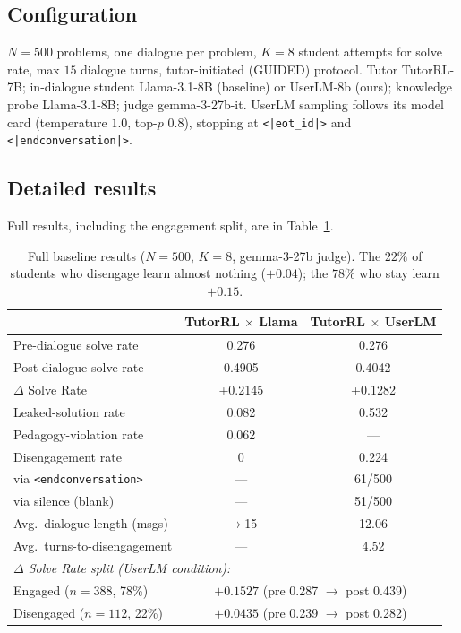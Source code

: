 \documentclass[11pt]{article}
\begin{document}
\subsection{Configuration}
$N{=}500$ problems, one dialogue per problem, $K{=}8$ student attempts for solve
rate, max $15$ dialogue turns, tutor-initiated (GUIDED) protocol. Tutor
TutorRL-7B; in-dialogue student Llama-3.1-8B (baseline) or UserLM-8b (ours);
knowledge probe Llama-3.1-8B; judge gemma-3-27b-it. UserLM sampling follows its
model card (temperature $1.0$, top-$p$ $0.8$), stopping at \texttt{<|eot\_id|>}
and \texttt{<|endconversation|>}.

\subsection{Detailed results}
Full results, including the engagement split, are in
Table~\ref{tab:baseline-full}.

\begin{table}[h]
\centering
\small
\begin{tabular}{lcc}
\toprule
& TutorRL $\times$ Llama & TutorRL $\times$ UserLM \\
\midrule
Pre-dialogue solve rate     & 0.276  & 0.276 \\
Post-dialogue solve rate    & 0.4905 & 0.4042 \\
$\Delta$ Solve Rate         & +0.2145 & +0.1282 \\
Leaked-solution rate        & 0.082  & 0.532 \\
Pedagogy-violation rate     & 0.062  & --- \\
Disengagement rate          & 0      & 0.224 \\
\quad via \texttt{<endconversation>} & --- & 61/500 \\
\quad via silence (blank)            & --- & 51/500 \\
Avg.\ dialogue length (msgs) & $\to$15 & 12.06 \\
Avg.\ turns-to-disengagement & ---     & 4.52 \\
\midrule
\multicolumn{3}{l}{\emph{$\Delta$ Solve Rate split (UserLM condition):}}\\
\quad Engaged ($n{=}388$, 78\%)    & \multicolumn{2}{c}{$+0.1527$ (pre 0.287 $\to$ post 0.439)} \\
\quad Disengaged ($n{=}112$, 22\%) & \multicolumn{2}{c}{$+0.0435$ (pre 0.239 $\to$ post 0.282)} \\
\bottomrule
\end{tabular}
\caption{Full baseline results ($N{=}500$, $K{=}8$, gemma-3-27b judge). The
$22\%$ of students who disengage learn almost nothing ($+0.04$); the $78\%$ who
stay learn $+0.15$.}
\label{tab:baseline-full}
\end{table}
\end{document}
